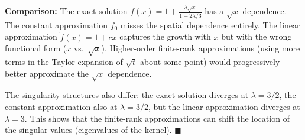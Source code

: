 \documentclass[12pt]{article}
\begin{document}
\textbf{Comparison:} The exact solution $f(x) = 1 + \frac{\lambda\sqrt{x}}{1-2\lambda/3}$ has a $\sqrt{x}$ dependence. The constant approximation $f_0$ misses the spatial dependence entirely. The linear approximation $\tilde{f}(x) = 1 + cx$ captures the growth with $x$ but with the wrong functional form ($x$ vs.\ $\sqrt{x}$). Higher-order finite-rank approximations (using more terms in the Taylor expansion of $\sqrt{t}$ about some point) would progressively better approximate the $\sqrt{x}$ dependence.

The singularity structures also differ: the exact solution diverges at $\lambda = 3/2$, the constant approximation also at $\lambda = 3/2$, but the linear approximation diverges at $\lambda = 3$. This shows that the finite-rank approximations can shift the location of the singular values (eigenvalues of the kernel). \hfill $\blacksquare$
\end{document}
